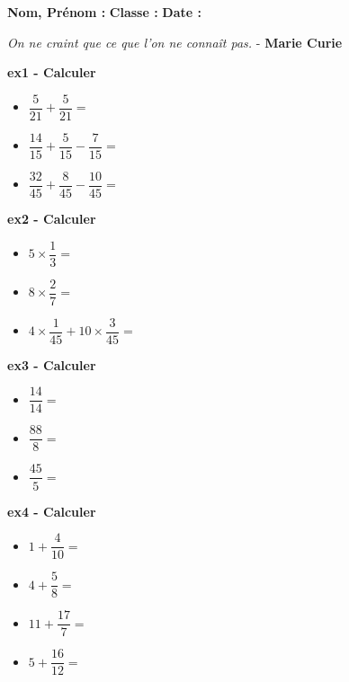 



\textbf{Nom, Prénom :} \hspace{8cm} \textbf{Classe :} \hspace{3cm} \textbf{Date :}\\

\begin{center}
  \textit{On ne craint que ce que l'on ne connaît pas.} - \textbf{Marie Curie}
\end{center}


\textbf{ex1 - Calculer}

\begin{multicols}{3} \begin{itemize}[label={$\bullet$}]
  \item $\dfrac{5}{21} + \dfrac{5}{21} =$ \dotfill
  \item $\dfrac{14}{15} + \dfrac{5}{15} - \dfrac{7}{15}  =$ \dotfill
  \item $\dfrac{32}{45}  + \dfrac{8}{45} - \dfrac{10}{45}  =$ \dotfill
\end{itemize} \end{multicols}

\textbf{ex2 - Calculer}

\begin{multicols}{3} \begin{itemize}[label={$\bullet$}]
  \item $5 \times \dfrac{1}{3} =$ \dotfill
  \item $8 \times \dfrac{2}{7} =$ \dotfill
  \item $4 \times \dfrac{1}{45}  + 10 \times \dfrac{3}{45} =$ \dotfill
\end{itemize} \end{multicols}


\textbf{ex3 - Calculer}

\begin{multicols}{3} \begin{itemize}[label={$\bullet$}]
  \item $\dfrac{14}{14} =$ \dotfill
  \item $\dfrac{88}{8} =$ \dotfill
  \item $\dfrac{45}{5} =$ \dotfill
\end{itemize} \end{multicols}

\textbf{ex4 - Calculer}

\begin{multicols}{2} \begin{itemize}[label={$\bullet$}]
  \item $1 + \dfrac{4}{10} =$ \dotfill
  \item $4 + \dfrac{5}{8} =$ \dotfill
  \item $11 + \dfrac{17}{7} =$ \dotfill
  \item $5 + \dfrac{16}{12} =$ \dotfill
\end{itemize} \end{multicols}

